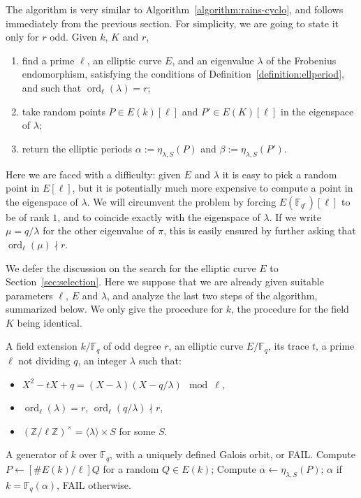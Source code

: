 \documentclass{mcom-l}
\theoremstyle{plain}
\theoremstyle{definition}
\DeclareMathOperator{\order}{ord} %
\newcommand{\Z}{\ensuremath{\mathbb{Z}}}
\newcommand{\F}{\ensuremath{\mathbb{F}}}
\newcounter{algorithm}
\begin{document}
The algorithm is very similar to
Algorithm~\ref{algorithm:rains-cyclo}, and follows immediately from
the previous section. For simplicity, we are going to state it only
for $r$ odd. Given $k$, $K$ and $r$,
\begin{enumerate}
\item find a prime $\ell$, an elliptic curve $E$, and an eigenvalue
  $\lambda$ of the Frobenius endomorphism, satisfying the conditions
  of Definition~\ref{definition:ellperiod}, and such that
  $\order_\ell(\lambda)=r$;
\item take random points $P\in E(k)[\ell]$ and $P'\in E(K)[\ell]$ in
  the eigenspace of $\lambda$;
\item return the elliptic periods $\alpha := \eta_{\lambda,S}(P)$ and
  $\beta:= \eta_{\lambda,S}(P')$.
\end{enumerate}

Here we are faced with a difficulty: given $E$ and $\lambda$ it is
easy to pick a random point in $E[\ell]$, but it is potentially much
more expensive to compute a point in the eigenspace of $\lambda$. We
will circumvent the problem by forcing $E(\F_{q^r})[\ell]$ to be of
rank $1$, and to coincide exactly with the eigenspace of $\lambda$.
If we write $\mu = q/\lambda$ for the other eigenvalue of $\pi$, this
is easily ensured by further asking that $\order_\ell(\mu) \nmid r$.

We defer the discussion on the search for the elliptic curve $E$ to
Section~\ref{sec:selection}. Here we suppose that we are already given
suitable parameters $\ell$, $E$ and $\lambda$, and analyze the last
two steps of the algorithm, summarized below.  We only give the
procedure for $k$, the procedure for the field $K$ being
identical.

\begin{algorithm}
\label{algorithm:compell}
  \begin{algorithmic}[1]
    \REQUIRE A field extension $k/\F_q$ of odd degree $r$,
    an elliptic curve $E/\F_q$, its trace $t$, a prime $\ell$ not dividing $q$,
    an integer $\lambda$ such that:
    \begin{itemize}
    \item $X^2 - tX + q = (X-\lambda)(X-q/\lambda) \mod\ell$,
    \item $\order_\ell(\lambda)=r$, $\order_\ell(q/\lambda)\nmid r$,
    \item $(\Z/\ell\Z)^{\times} = \langle{\lambda}\rangle \times S$ for some $S$.
    \end{itemize}
    \ENSURE A generator of $k$ over $\F_q$, with a uniquely defined Galois orbit, or FAIL.
    \REPEAT
    \STATE Compute $P\leftarrow[\# E(k)/\ell]Q$ for a random $Q\in E(k)$;
    \STATE Compute $\alpha\leftarrow\eta_{\lambda,S}(P)$;
    \RETURN $\alpha$ if $k=\F_q(\alpha)$, FAIL otherwise.
  \end{algorithmic}
\end{algorithm}
\end{document}
